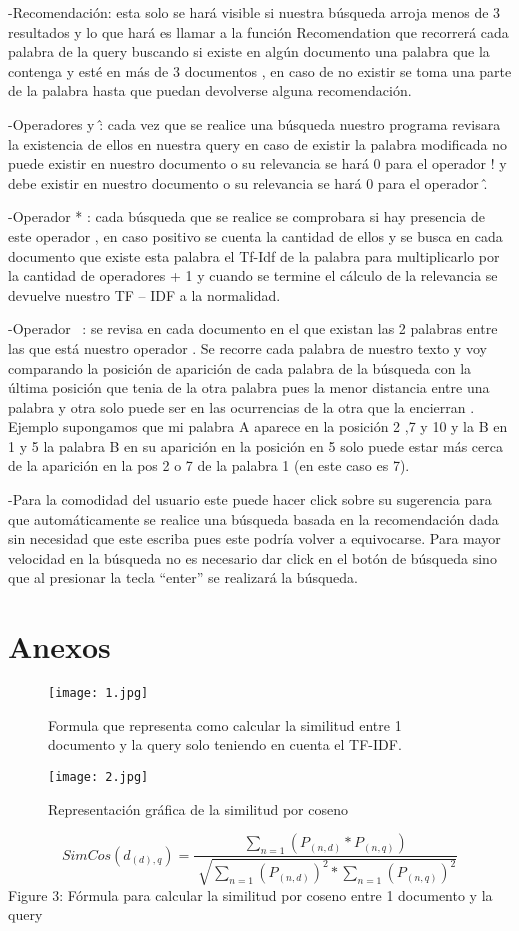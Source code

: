 \documentclass[12pt]{article}
\begin{document}
-Recomendación: esta solo se hará visible si nuestra búsqueda arroja menos de 3
resultados y lo que hará es llamar a la función Recomendation que recorrerá cada
palabra de la query buscando si existe en algún documento una palabra que la
contenga y esté en más de 3 documentos , en caso de no existir se toma una parte de
la palabra hasta que puedan devolverse alguna recomendación.

-Operadores \! y \^ : cada vez que se realice una búsqueda nuestro programa revisara la
existencia de ellos en nuestra query en caso de existir la palabra modificada no puede
existir en nuestro documento o su relevancia se hará 0 para el operador ! y debe existir
en nuestro documento o su relevancia se hará 0 para el operador \^ .

-Operador * : cada búsqueda que se realice se comprobara si hay presencia de este
operador , en caso positivo se cuenta la cantidad de ellos y se busca en cada
documento que existe esta palabra el Tf-Idf de la palabra para multiplicarlo por la
cantidad de operadores + 1 y cuando se termine el cálculo de la relevancia se
devuelve nuestro TF – IDF a la normalidad.

-Operador ~: se revisa en cada documento en el que existan las 2 palabras entre las
que está nuestro operador . Se recorre cada palabra de nuestro texto y voy
comparando la posición de aparición de cada palabra de la búsqueda con la última
posición que tenia de la otra palabra pues la menor distancia entre una palabra y otra
solo puede ser en las ocurrencias de la otra que la encierran . Ejemplo supongamos
que mi palabra A aparece en la posición 2 ,7 y 10 y la B en 1 y 5 la palabra B en su
aparición en la posición en 5 solo puede estar más cerca de la aparición en la pos 2 o 7
de la palabra 1 (en este caso es 7).

-Para la comodidad del usuario este puede hacer click sobre su sugerencia para que
automáticamente se realice una búsqueda basada en la recomendación dada sin
necesidad que este escriba pues este podría volver a equivocarse.
Para mayor velocidad en la búsqueda no es necesario dar click en el botón de
búsqueda sino que al presionar la tecla “enter” se realizará la búsqueda.

\newpage

\section*{Anexos}
\begin{figure}[h]
    \texttt{[image: 1.jpg]}
    \caption{Formula que representa como calcular la similitud entre 1 documento y la
        query solo teniendo en cuenta el TF-IDF.}
\end{figure}


\begin{figure}[h]
    \texttt{[image: 2.jpg]}
    \caption{Representación gráfica de la similitud por coseno}
\end{figure}
\begin{equation}
    SimCos(d_{(d),q})=\frac{\sum_{n = 1}^{}(P_{( n,d) } * P_{( n,q) })   }{\sqrt[]{\sum_{n = 1}(P_{(n,d)})^2 * \sum_{n=1}(P_{(n,q)})^2}  }
\end{equation}
Figure 3: Fórmula para calcular la similitud por coseno entre 1 documento y la query
\end{document}
